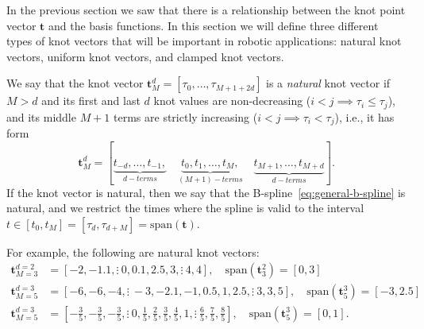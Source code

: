 In the previous section we saw that there is a relationship between the knot point vector $\mathbf{t}$ and the basis functions.  In this section we will define three different types of knot vectors that will be important in robotic applications: natural knot vectors, uniform knot vectors, and clamped knot vectors.  

\begin{definition}
We say that the knot vector $\mathbf{t}_M^d = [\tau_0, \dots, \tau_{M+1+2d}]$ is a {\em natural} knot vector if $M>d$ and its first and last $d$ knot values are non-decreasing ($i<j \implies \tau_i\leq\tau_j$), and its middle $M+1$ terms are strictly increasing ($i<j \implies \tau_i<\tau_j$), i.e., it has form
\[
\mathbf{t}_M^d = [\underbrace{t_{-d}, \dots, t_{-1},}_{d-terms} \quad
			 \underbrace{t_0, t_1, \dots, t_M,}_{(M+1)-terms} \quad
			 \underbrace{t_{M+1}, \dots, t_{M+d}}_{d-terms}].	
\] 
If the knot vector is natural, then we say that the B-spline~\eqref{eq:general-b-spline} is natural, and we restrict the times where the spline is valid to the interval $t\in[t_0, t_M] = [\tau_d, \tau_{d+M}]=\text{span}(\mathbf{t})$.
\end{definition}
For example, the following are natural knot vectors:
\begin{align*}
	\mathbf{t}_{M=3}^{d=2} &= [-2, -1.1, \vdots~ 0, 0.1, 2.5, 3, \vdots~ 4, 4], 
		\quad \text{span}(\mathbf{t}_3^2)=[0, 3] \\
	\mathbf{t}_{M=5}^{d=3} &= [-6, -6, -4,\vdots~  -3, -2.1, -1, 0.5, 1, 2.5, \vdots~ 3, 3, 5],
		\quad \text{span}(\mathbf{t}_5^3)=[-3, 2.5]\\
	\mathbf{t}_{M=5}^{d=3} &= [-\frac{3}{5}, -\frac{3}{5}, -\frac{3}{5}, \vdots~  0, \frac{1}{5}, \frac{2}{5}, \frac{3}{5}, \frac{4}{5}, 1, \vdots~  \frac{6}{5}, \frac{7}{5}, \frac{8}{5}], 
		\quad \text{span}(\mathbf{t}_5^3)=[0, 1].
\end{align*}


